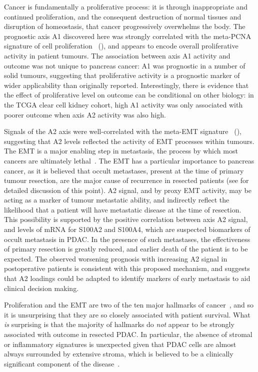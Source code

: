 \documentclass[dissertation.tex]{subfiles}
\begin{document}
Cancer is fundamentally a proliferative process: it is through inappropriate and continued proliferation, and the consequent destruction of normal tissues and disruption of homeostasis, that cancer progressively overwhelms the body.  The prognostic axis A1 discovered here was strongly correlated with the meta-PCNA signature of cell proliferation~\cite{Venet2011} (), and appears to encode overall proliferative activity in patient tumours.  The association between axis A1 activity and outcome was not unique to pancreas cancer: A1 was prognostic in a number of solid tumours, suggesting that proliferative activity is a prognostic marker of wider applicability than originally reported.  Interestingly, there is evidence that the effect of proliferative level on outcome can be conditional on other biology: in the \gls{TCGA} clear cell kidney cohort, high A1 activity was only associated with poorer outcome when axis A2 activity was also high.

Signals of the A2 axis were well-correlated with the meta-EMT signature~\cite{Groger2012} (), suggesting that A2 levels reflected the activity of \gls{EMT} processes within tumours.  The \gls{EMT} is a major enabling step in metastasis, the process by which most cancers are ultimately lethal~\cite{Talmadge2010}.  The \gls{EMT} has a particular importance to pancreas cancer, as it is believed that occult metastases, present at the time of primary tumour resection, are the major cause of recurrence in resected patients (see  for detailed discussion of this point).  A2 signal, and by proxy \gls{EMT} activity, may be acting as a marker of tumour metastatic ability, and indirectly reflect the likelihood that a patient will have metastatic disease at the time of resection.  This possibility is supported by the positive correlation between axis A2 signal, and levels of mRNA for S100A2 and S100A4, which are suspected biomarkers of occult metastasis in \gls{PDAC}.  In the presence of such metastases, the effectiveness of primary resection is greatly reduced, and earlier death of the patient is to be expected.  The observed worsening prognosis with increasing A2 signal in postoperative patients is consistent with this proposed mechanism, and suggests that A2 loadings could be adapted to identify markers of early metastasis to aid clinical decision making.

Proliferation and the \gls{EMT} are two of the ten major hallmarks of cancer~\cite{Hanahan2011}, and so it is unsurprising that they are so closely associated with patient survival.  What \emph{is} surprising is that the majority of hallmarks do \emph{not} appear to be strongly associated with outcome in resected \gls{PDAC}.  In particular, the absence of stromal or inflammatory signatures is unexpected given that \gls{PDAC} cells are almost always surrounded by extensive stroma, which is believed to be a clinically significant component of the disease~\cite{Luo2012}.
\end{document}
